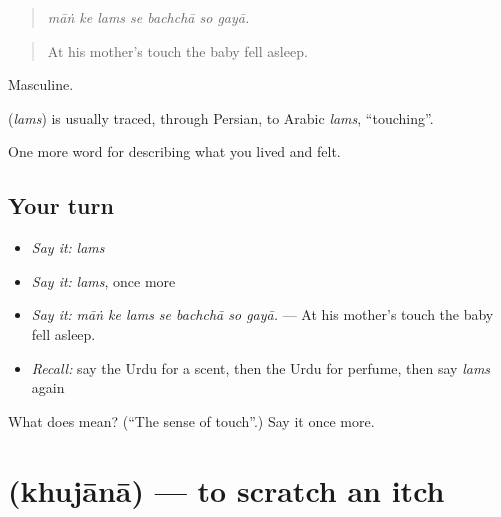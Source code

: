 \begin{quote}
      
\end{quote}

\begin{quote}
\emph{māṅ ke lams se bachchā so gayā.}
\end{quote}

\begin{quote}
At his mother's touch the baby fell asleep.
\end{quote}

Masculine.

\begin{cousinweb}
\textbf{} (\emph{lams}) is usually traced, through Persian, to Arabic \emph{lams}, \textquotedblleft{}touching\textquotedblright{}.
\end{cousinweb}

\begin{grammarlens}[title={What you've built}]
One more word for describing what you lived and felt.
\end{grammarlens}

\subsection*{Your turn}
\begin{itemize}
\raggedright
  \item \emph{Say it:} \emph{lams}
  \item \emph{Say it:} \emph{lams}, once more
  \item \emph{Say it:} \emph{māṅ ke lams se bachchā so gayā.} — At his mother's touch the baby fell asleep.
  \item \emph{Recall:} say the Urdu for a scent, then the Urdu for perfume, then say \emph{lams} again
\end{itemize}

\begin{tcolorbox}[breakable,colback=teal!4,colframe=teal!35!black,title={Before you move on}]
What does  mean? (\textquotedblleft{}The sense of touch\textquotedblright{}.) Say it once more.
\end{tcolorbox}
\section[\texorpdfstring{\ur{کھجانا} (khujānā)}{کھجانا (khujānā)}]{ (khujānā) — to scratch an itch}

\label{lesson:UR-C468-khujana}



